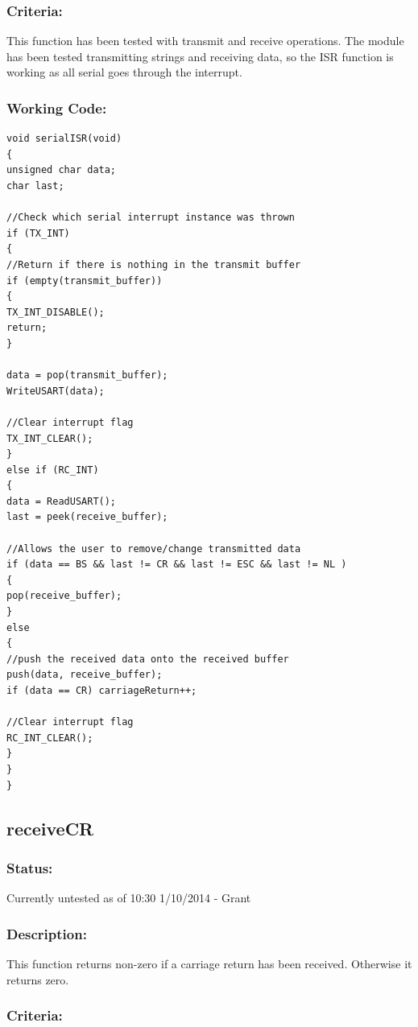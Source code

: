 \documentclass[]{report}
\begin{document}
\subsubsection{Criteria:}
This function has been tested with transmit and receive operations. The module has been tested transmitting strings and receiving data, so the ISR function is working as all serial goes through the interrupt.

\subsubsection{Working Code:}
\begin{lstlisting}
void serialISR(void)
{
unsigned char data;
char last;

//Check which serial interrupt instance was thrown
if (TX_INT)
{
//Return if there is nothing in the transmit buffer
if (empty(transmit_buffer))
{
TX_INT_DISABLE();
return;
}

data = pop(transmit_buffer);
WriteUSART(data);

//Clear interrupt flag
TX_INT_CLEAR();
}
else if (RC_INT)
{
data = ReadUSART();
last = peek(receive_buffer);

//Allows the user to remove/change transmitted data
if (data == BS && last != CR && last != ESC && last != NL )
{
pop(receive_buffer);
}
else
{
//push the received data onto the received buffer
push(data, receive_buffer);
if (data == CR) carriageReturn++;

//Clear interrupt flag
RC_INT_CLEAR();
}
}
}
\end{lstlisting}

\subsection{receiveCR}
\subsubsection{Status:}
Currently untested as of 10:30 1/10/2014 - Grant

\subsubsection{Description:}
This function returns non-zero if a carriage return has been received. Otherwise it returns zero.

\subsubsection{Criteria:}
\end{document}
